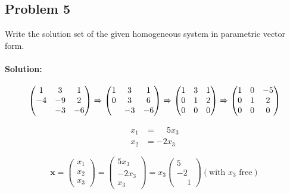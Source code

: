\documentclass[11pt, notitlepage]{report}
\newenvironment{solution}{\paragraph{\small Solution:}}{\hfill}
\begin{document}
\subsection{Problem 5}

Write the solution set of the given homogeneous system in parametric vector form.

\begin{solution}

\[
\left(\begin{matrix}{}
  1& 3& 1\\
  -4&-9 &2 \\
    &-3 &-6
\end{matrix}\right)
%
\xRightarrow{}
%
\left(\begin{matrix}{}
  1 & 3 & 1\\
  0 & 3 & 6 \\
    &-3 &-6
\end{matrix}\right)
%
\xRightarrow{}
%
\left(\begin{matrix}{}
  1 & 3 & 1\\
  0 & 1 & 2 \\
  0 &0 &0
\end{matrix}\right)
%
\xRightarrow{}
%
\left(\begin{matrix}{}
  1 & 0 & -5\\
  0 & 1 & 2 \\
  0 &0 &0
\end{matrix}\right)
\]

\begin{align*}
x_1 &= \phantom{-}5x_3 \\
x_2 &= -2x_3
\end{align*}

\[
\textbf{x}= \left(\begin{matrix}{}
  x_1\\
  x_2\\
  x_3
\end{matrix}\right)
= \left(\begin{matrix}{}
  5x_3\\
  -2x_3\\
  x_3
\end{matrix}\right)
= x_3
\left(\begin{matrix}{}
  5 \\
  -2 \\
  \phantom{-}1
\end{matrix}\right) (\text{with $x_3$ free})
\]


\end{solution}
\end{document}
